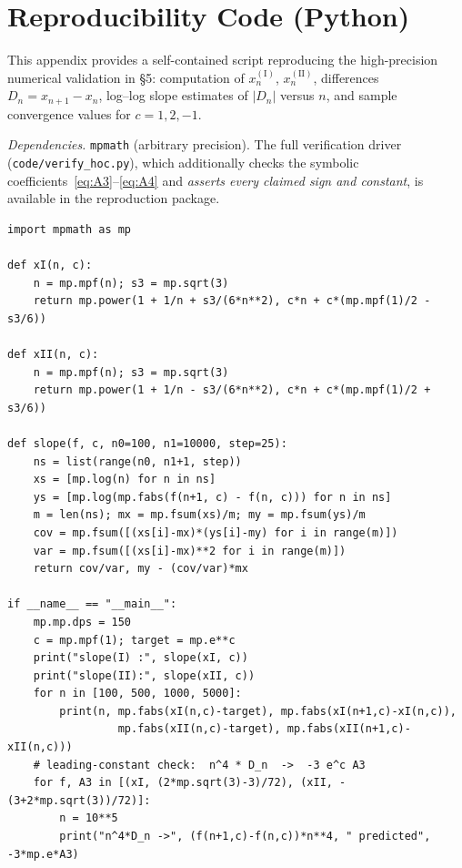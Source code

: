 \documentclass[11pt]{article}
\theoremstyle{definition}
\begin{document}
\appendix
\section{Reproducibility Code (Python)}\label{app:code}
This appendix provides a self-contained script reproducing the high-precision
numerical validation in \S5: computation of $x_n^{(\mathrm{I})}$,
$x_n^{(\mathrm{II})}$, differences $D_n=x_{n+1}-x_n$, log--log slope estimates of
$|D_n|$ versus $n$, and sample convergence values for $c=1,2,-1$.

\emph{Dependencies.} \texttt{mpmath} (arbitrary precision). The full verification
driver (\texttt{code/verify\_hoc.py}), which additionally checks the symbolic
coefficients~\eqref{eq:A3}--\eqref{eq:A4} and \emph{asserts every claimed sign and
constant}, is available in the reproduction package.

\begin{lstlisting}[basicstyle=\ttfamily\footnotesize,breaklines=true,frame=single]
import mpmath as mp

def xI(n, c):
    n = mp.mpf(n); s3 = mp.sqrt(3)
    return mp.power(1 + 1/n + s3/(6*n**2), c*n + c*(mp.mpf(1)/2 - s3/6))

def xII(n, c):
    n = mp.mpf(n); s3 = mp.sqrt(3)
    return mp.power(1 + 1/n - s3/(6*n**2), c*n + c*(mp.mpf(1)/2 + s3/6))

def slope(f, c, n0=100, n1=10000, step=25):
    ns = list(range(n0, n1+1, step))
    xs = [mp.log(n) for n in ns]
    ys = [mp.log(mp.fabs(f(n+1, c) - f(n, c))) for n in ns]
    m = len(ns); mx = mp.fsum(xs)/m; my = mp.fsum(ys)/m
    cov = mp.fsum([(xs[i]-mx)*(ys[i]-my) for i in range(m)])
    var = mp.fsum([(xs[i]-mx)**2 for i in range(m)])
    return cov/var, my - (cov/var)*mx

if __name__ == "__main__":
    mp.mp.dps = 150
    c = mp.mpf(1); target = mp.e**c
    print("slope(I) :", slope(xI, c))
    print("slope(II):", slope(xII, c))
    for n in [100, 500, 1000, 5000]:
        print(n, mp.fabs(xI(n,c)-target), mp.fabs(xI(n+1,c)-xI(n,c)),
                 mp.fabs(xII(n,c)-target), mp.fabs(xII(n+1,c)-xII(n,c)))
    # leading-constant check:  n^4 * D_n  ->  -3 e^c A3
    for f, A3 in [(xI, (2*mp.sqrt(3)-3)/72), (xII, -(3+2*mp.sqrt(3))/72)]:
        n = 10**5
        print("n^4*D_n ->", (f(n+1,c)-f(n,c))*n**4, " predicted", -3*mp.e*A3)
\end{lstlisting}
\end{document}
